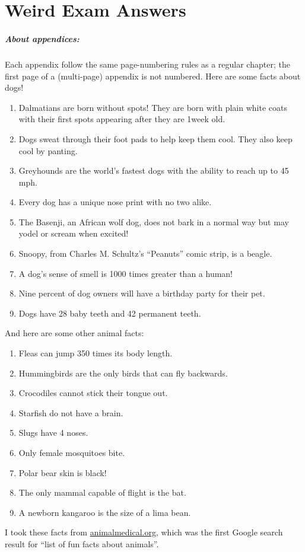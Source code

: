 
\chapter{Weird Exam Answers}	%

\paragraph{About appendices:}
	Each appendix follow the same page-numbering rules as a regular chapter; the
	first page of a (multi-page) appendix is not numbered.  Here are some facts about dogs!

\begin{enumerate}
	\item Dalmatians are born without spots!  They are born with plain white coats with their first spots appearing after they are 1week old.
	\item Dogs sweat through their foot pads to help keep them cool.  They also keep cool by panting.
	\item Greyhounds are the world's fastest dogs with the ability to reach up to 45 mph.
	\item Every dog has a unique nose print with no two alike.
	\item The Basenji, an African wolf dog, does not bark in a normal way but may yodel or scream when excited!
	\item Snoopy, from Charles M. Schultz's “Peanuts” comic strip, is a beagle.
	\item A dog's sense of smell is 1000 times greater than a human!
	\item Nine percent of dog owners will have a birthday party for their pet.
	\item Dogs have 28 baby teeth and 42 permanent teeth.
\end{enumerate}

And here are some other animal facts:

\begin{enumerate}
 \item Fleas can jump 350 times its body length.
 \item Hummingbirds are the only birds that can fly backwards.
 \item Crocodiles cannot stick their tongue out.
 \item Starfish do not have a brain.
 \item Slugs have 4 noses.
 \item Only female mosquitoes bite.
 \item Polar bear skin is black!
 \item The only mammal capable of flight is the bat.
 \item A newborn kangaroo is the size of a lima bean.
\end{enumerate}

I took these facts from
\href{https://animalmedical.org/fun-facts}{animalmedical.org}, which was the
first Google search result for ``list of fun facts about animals''.
